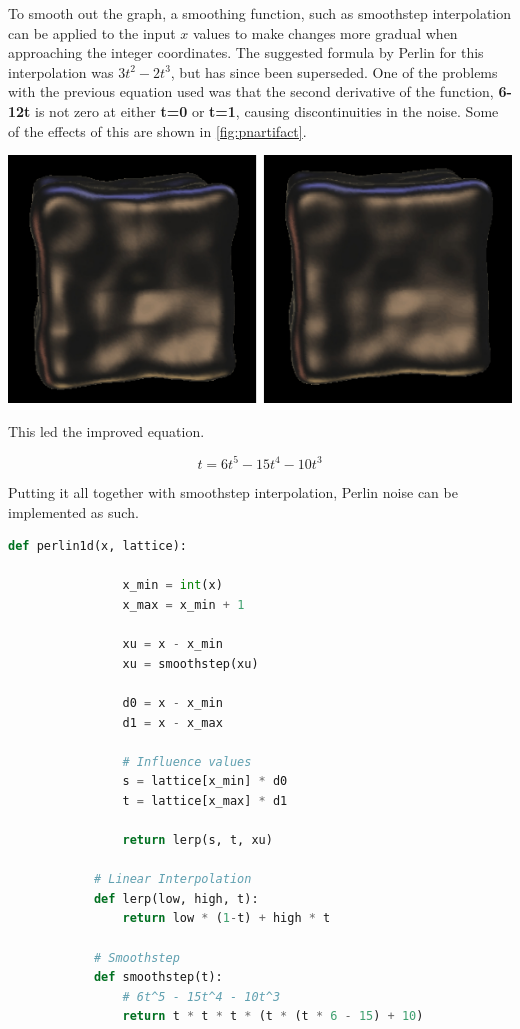 \documentclass[10pt]{report}
\begin{document}
		To smooth out the graph, a smoothing function, such as smoothstep interpolation can be applied to the input \(x\) values to make changes more gradual when approaching the integer coordinates. The suggested formula by Perlin for this interpolation was \(3t^2 - 2t^3\), but has since been superseded. One of the problems with the previous equation used was that the second derivative of the function, \textbf{6-12t} is not zero at either \textbf{t=0} or \textbf{t=1}, causing discontinuities in the noise. Some of the effects of this are shown in \autoref{fig:pnartifact}.
		
		\begin{minipage}{\textwidth}
			\centering
			\includegraphics[scale=.5]{s-curve}
			\label{fig:pnartifact}
		\end{minipage} 
		
		This led the improved equation. 
		
		\[t = 6t^5 - 15t^4 - 10t^3\]
		
		Putting it all together with smoothstep interpolation, Perlin noise can be implemented as such. 
		
		\begin{lstlisting}[label={lst:perlin1d}, language=Python, frame=none, caption={1D Perlin Noise}, captionpos=b]
			def perlin1d(x, lattice):
			
				x_min = int(x)
				x_max = x_min + 1
				
				xu = x - x_min
				xu = smoothstep(xu)
				
				d0 = x - x_min
				d1 = x - x_max
				
				# Influence values
				s = lattice[x_min] * d0
				t = lattice[x_max] * d1
				
				return lerp(s, t, xu)
			
			# Linear Interpolation
			def lerp(low, high, t):
				return low * (1-t) + high * t
			
			# Smoothstep
			def smoothstep(t):
				# 6t^5 - 15t^4 - 10t^3
				return t * t * t * (t * (t * 6 - 15) + 10)
		\end{lstlisting}
	
\end{document}
